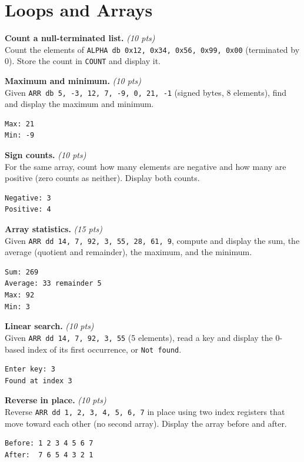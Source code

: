 \documentclass[11pt,letterpaper]{article}
\newcommand{\pts}[1]{\hfill\textit{(#1 pts)}}
\newcommand{\ttl}[1]{\textbf{#1.}}
\begin{document}
\section{Loops and Arrays}

\begin{problems}

\item \ttl{Count a null-terminated list} \pts{10}
\\Count the elements of \texttt{ALPHA db 0x12, 0x34, 0x56, 0x99, 0x00} (terminated by 0). Store the count in \texttt{COUNT} and display it.

\item \ttl{Maximum and minimum} \pts{10}
\\Given \texttt{ARR db 5, -3, 12, 7, -9, 0, 21, -1} (signed bytes, 8 elements), find and display the maximum and minimum.
\begin{lstlisting}[style=out]
Max: 21
Min: -9
\end{lstlisting}

\item \ttl{Sign counts} \pts{10}
\\For the same array, count how many elements are negative and how many are positive (zero counts as neither). Display both counts.
\begin{lstlisting}[style=out]
Negative: 3
Positive: 4
\end{lstlisting}

\item \ttl{Array statistics} \pts{15}
\\Given \texttt{ARR dd 14, 7, 92, 3, 55, 28, 61, 9}, compute and display the sum, the average (quotient and remainder), the maximum, and the minimum.
\begin{lstlisting}[style=out]
Sum: 269
Average: 33 remainder 5
Max: 92
Min: 3
\end{lstlisting}

\item \ttl{Linear search} \pts{10}
\\Given \texttt{ARR dd 14, 7, 92, 3, 55} (5 elements), read a key and display the 0-based index of its first occurrence, or \texttt{Not found}.
\begin{lstlisting}[style=out]
Enter key: 3
Found at index 3
\end{lstlisting}

\item \ttl{Reverse in place} \pts{10}
\\Reverse \texttt{ARR dd 1, 2, 3, 4, 5, 6, 7} in place using two index registers that move toward each other (no second array). Display the array before and after.
\begin{lstlisting}[style=out]
Before: 1 2 3 4 5 6 7
After:  7 6 5 4 3 2 1
\end{lstlisting}


\end{problems}
\end{document}
